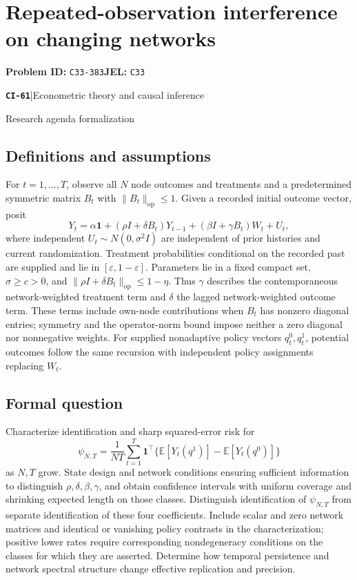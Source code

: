 \documentclass[11pt,a4paper]{article}
\newcommand{\E}{\mathbb E}
\newcommand{\entrymeta}[3]{{\sffamily\small\color{muted}\textbf{\texttt{#1}}\quad|\quad #2\par #3\par}}
\begin{document}
\section*{Repeated-observation interference on changing networks}
\textbf{Problem ID:} \texttt{C33-383}\quad \textbf{JEL:} \texttt{C33}\par
\label{problem:OP-0540}
\label{beyond:CI-61}
\entrymeta{CI-61}{Econometric theory and causal inference}{Research agenda formalization}
\subsection*{Definitions and assumptions}
For $t=1,\ldots,T$, observe all $N$ node outcomes and treatments and a predetermined symmetric matrix $B_t$ with $\|B_t\|_{\mathrm{op}}\leq1$. Given a recorded initial outcome vector, posit
\[
 Y_t=\alpha\mathbf1+(\rho I+\delta B_t)Y_{t-1}
             +(\beta I+\gamma B_t)W_t+U_t,
\]
where independent $U_t\sim N(0,\sigma^2 I)$ are independent of prior histories and current randomization. Treatment probabilities conditional on the recorded past are supplied and lie in $[\varepsilon,1-\varepsilon]$. Parameters lie in a fixed compact set, $\sigma\geq c>0$, and $\|\rho I+\delta B_t\|_{\mathrm{op}}\leq1-\eta$. Thus $\gamma$ describes the contemporaneous network-weighted treatment term and $\delta$ the lagged network-weighted outcome term. These terms include own-node contributions when $B_t$ has nonzero diagonal entries; symmetry and the operator-norm bound impose neither a zero diagonal nor nonnegative weights. For supplied nonadaptive policy vectors $q_t^0,q_t^1$, potential outcomes follow the same recursion with independent policy assignments replacing $W_t$.
\subsection*{Formal question}
Characterize identification and sharp squared-error risk for
\[
 \psi_{N,T}=\frac1{NT}\sum_{t=1}^T
 \mathbf1^\top\{\E[Y_t(q^1)]-\E[Y_t(q^0)]\}
\]
as $N,T$ grow. State design and network conditions ensuring sufficient information to distinguish $\rho,\delta,\beta,\gamma$, and obtain confidence intervals with uniform coverage and shrinking expected length on those classes. Distinguish identification of $\psi_{N,T}$ from separate identification of these four coefficients. Include scalar and zero network matrices and identical or vanishing policy contrasts in the characterization; positive lower rates require corresponding nondegeneracy conditions on the classes for which they are asserted. Determine how temporal persistence and network spectral structure change effective replication and precision.
\end{document}
